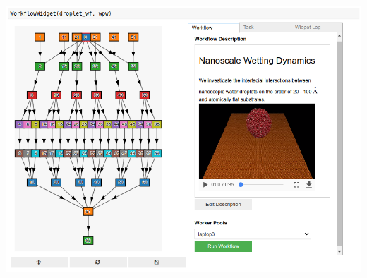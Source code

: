 \documentclass{tikzposter}
\begin{document}
\begin{columns}
 {
    \includegraphics[width=\linewidth]{../img/screenshot/visualize_droplet}
}


\end{columns}
\end{document}
